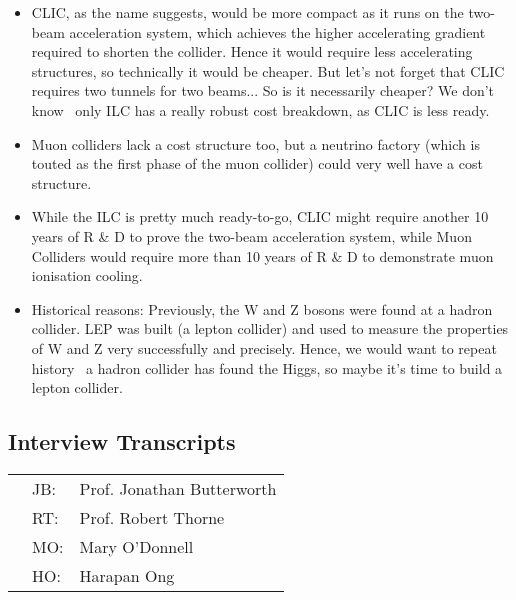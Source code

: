 \begin{itemize}
\item CLIC, as the name suggests, would be more compact as it runs on the two-beam acceleration system, which achieves the higher accelerating gradient required to shorten the collider. Hence it would require less accelerating structures, so technically it would be cheaper. But let's not forget that CLIC requires two tunnels for two beams... So is it necessarily cheaper? We don't know \textemdash \ only ILC has a really robust cost breakdown, as CLIC is less ready.

\item Muon colliders lack a cost structure too, but a neutrino factory (which is touted as the first phase of the muon collider) could very well have a cost structure. 

\item While the ILC is pretty much ready-to-go, CLIC might require another 10 years of R \& D to prove the two-beam acceleration system, while Muon Colliders would require more than 10 years of R \& D to demonstrate muon ionisation cooling.

\item Historical reasons: Previously, the W and Z bosons were found at a hadron collider. LEP was built (a lepton collider) and used to measure the properties of W and Z very successfully and precisely. Hence, we would want to repeat history \textemdash \ a hadron collider has found the Higgs, so maybe it's time to build a lepton collider.
\end{itemize}

\clearpage

\subsection{Interview Transcripts}
\begin{table}[!ht]
\begin{tabular}{@{}p{0mm}p{5mm}p{130mm}@{}}
& JB: & Prof. Jonathan Butterworth\\
& RT: & Prof. Robert Thorne\\
& MO: & Mary O'Donnell\\
& HO: & Harapan Ong
\end{tabular}
\end{table}

